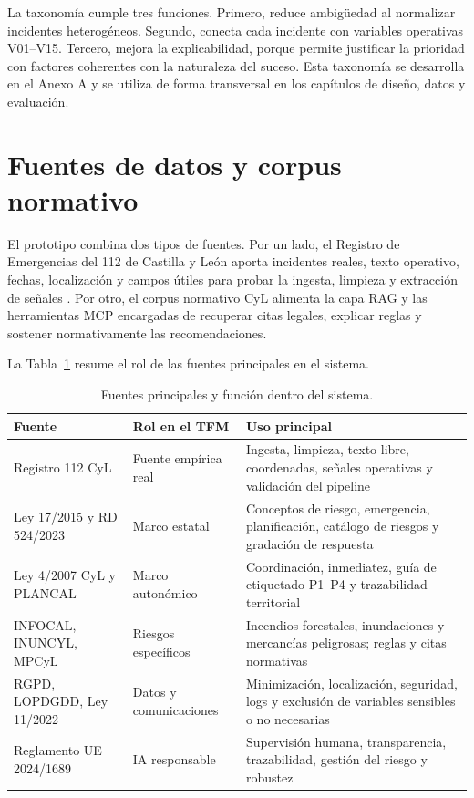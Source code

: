 La taxonomía cumple tres funciones. Primero, reduce ambigüedad al normalizar incidentes heterogéneos. Segundo, conecta cada incidente con variables operativas V01--V15. Tercero, mejora la explicabilidad, porque permite justificar la prioridad con factores coherentes con la naturaleza del suceso. Esta taxonomía se desarrolla en el Anexo A y se utiliza de forma transversal en los capítulos de diseño, datos y evaluación.

\section{Fuentes de datos y corpus normativo}

El prototipo combina dos tipos de fuentes. Por un lado, el Registro de Emergencias del 112 de Castilla y León aporta incidentes reales, texto operativo, fechas, localización y campos útiles para probar la ingesta, limpieza y extracción de señales \cite{Registro112CyL}. Por otro, el corpus normativo CyL alimenta la capa RAG y las herramientas MCP encargadas de recuperar citas legales, explicar reglas y sostener normativamente las recomendaciones.

La Tabla~\ref{tab:cap3_fuentes} resume el rol de las fuentes principales en el sistema.

\begin{table}[htbp]
\centering
\small
\begin{tabular}{|p{3.4cm}|p{4.1cm}|p{5.5cm}|}
\hline
\textbf{Fuente} & \textbf{Rol en el TFM} & \textbf{Uso principal} \\ \hline
Registro 112 CyL & Fuente empírica real & Ingesta, limpieza, texto libre, coordenadas, señales operativas y validación del pipeline \\ \hline
Ley 17/2015 y RD 524/2023 & Marco estatal & Conceptos de riesgo, emergencia, planificación, catálogo de riesgos y gradación de respuesta \\ \hline
Ley 4/2007 CyL y PLANCAL & Marco autonómico & Coordinación, inmediatez, guía de etiquetado P1--P4 y trazabilidad territorial \\ \hline
INFOCAL, INUNCYL, MPCyL & Riesgos específicos & Incendios forestales, inundaciones y mercancías peligrosas; reglas y citas normativas \\ \hline
RGPD, LOPDGDD, Ley 11/2022 & Datos y comunicaciones & Minimización, localización, seguridad, logs y exclusión de variables sensibles o no necesarias \\ \hline
Reglamento UE 2024/1689 & IA responsable & Supervisión humana, transparencia, trazabilidad, gestión del riesgo y robustez \\ \hline
\end{tabular}
\caption{Fuentes principales y función dentro del sistema.}
\label{tab:cap3_fuentes}
\end{table}

